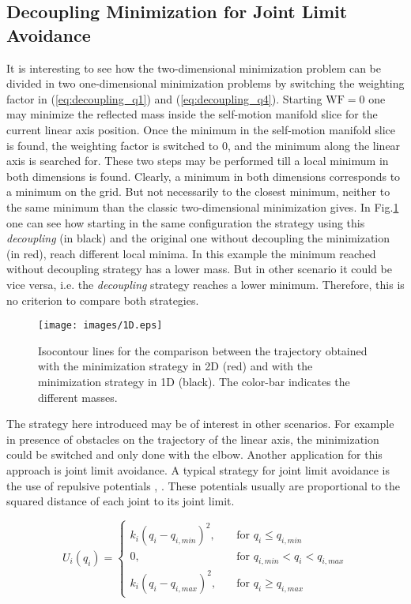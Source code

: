 \subsection{Decoupling Minimization for Joint Limit Avoidance}
\label{subsec:wf_JLA}

It is interesting to see how the two-dimensional minimization problem can be divided in two one-dimensional minimization problems by switching the weighting factor in (\ref{eq:decoupling_q1}) and (\ref{eq:decoupling_q4}). Starting  $\mathrm{WF  = 0}$  one may minimize the reflected mass inside the self-motion manifold slice for the current linear axis position. Once the minimum in the self-motion manifold slice is found, the weighting factor is switched to $0$, and the minimum along the linear axis is searched for. These two steps may be performed till a local minimum in both dimensions is found. 
Clearly, a minimum in both dimensions corresponds to a minimum on the grid. But not necessarily to the closest minimum, neither to the same minimum than the classic two-dimensional minimization gives. In  Fig.\ref{fig:1D} one can see how starting in the same configuration the strategy using this \textit{decoupling} (in black) and the original one without decoupling the minimization (in red), reach different local minima. In this example the minimum reached without decoupling strategy has a lower mass. But in other scenario it could be vice versa, i.e. the \textit{decoupling}  strategy reaches a lower minimum. 	Therefore, this is no criterion to compare both strategies.
%
\begin{figure}[!htb]
	\centerline{
		\texttt{[image: images/1D.eps]}}
	\caption{Isocontour lines for the comparison between the trajectory obtained with the minimization strategy in 2D (red) and with the minimization strategy in 1D (black). The color-bar indicates the different masses.}
	\label{fig:1D}
\end{figure} 
%
The strategy here introduced may be of interest in other scenarios. For example in presence of obstacles on the trajectory of the linear axis, the minimization could be switched and only done with the elbow.
Another application for this approach is joint limit avoidance.
A typical strategy for joint limit avoidance is the use of repulsive potentials \cite{JLA_3}, \cite{JLA_4}. These potentials usually are proportional to the squared distance of each joint to its joint limit. 

\begin{equation} 
U_i(q_i) = 
\begin{cases}
k_{i} (q_{i} - q_{i,min})^{2}, &\quad\text{for \ }  q_i\le q_{i,min}\\
\text{0}, &\quad\text{for \ } q_{i,min} < q_i < q_{i,max}\\
k_{i} (q_{i} - q_{i,max})^{2}, &\quad\text{for \ }  q_i\ge q_{i,max}	
\end{cases}
\label{eq:JLA_dietrich}
\end{equation}


